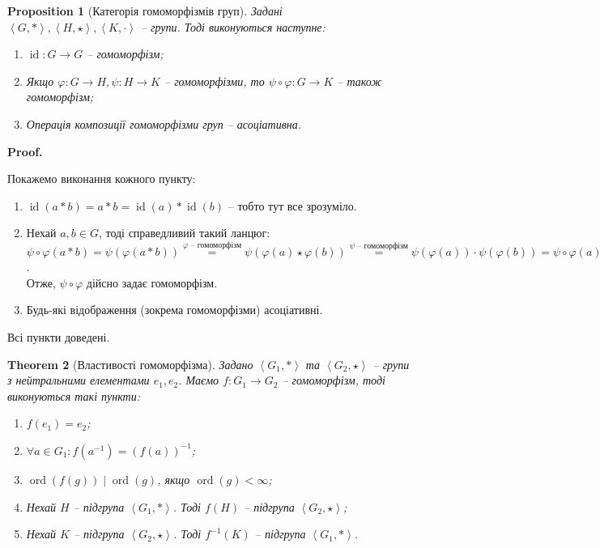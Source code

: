 \documentclass[a4paper, 10pt]{article}
\makeatletter
\theoremstyle{theoremdd}
\newtheorem{theorem}{Theorem}[subsection]
\theoremstyle{theoremdd}
\theoremstyle{theoremdd}
\theoremstyle{theoremdd}
\theoremstyle{theoremdd}
\theoremstyle{theoremdd}
\theoremstyle{theoremdd}
\theoremstyle{theoremdd}
\theoremstyle{theoremdd}
\newtheorem{proposition}[theorem]{Proposition}
\theoremstyle{theoremdd}
\theoremstyle{theoremdd}
\theoremstyle{theoremdd}
\theoremstyle{theoremdd}
\theoremstyle{theoremdd}
\theoremstyle{theoremdd}
\renewenvironment{proof}[1][Proof.\\]{\par
\pushQED{\hfill \qed}%
\normalfont \topsep6\p@\@plus6\p@\relax
\trivlist
\item\relax
{\bfseries
#1\@addpunct{.}}\hspace\labelsep\ignorespaces
}{%
\popQED\endtrivlist\@endpefalse
}
\DeclareMathOperator{\ord}{ord}
\DeclareMathOperator{\id}{id}
\makeatother
\begin{document}
\begin{proposition}[Категорія гомоморфізмів груп]
Задані $\left< G, * \right>, \left< H, \star \right>, \left<K, \cdot \right>$ -- групи. Тоді виконуються наступне:
\begin{enumerate}[nosep,wide=0pt,label={\arabic*)}]
\item $\id \colon G \to G$ -- гомоморфізм;
\item Якщо $\varphi \colon G \! \to H, \psi \colon H \! \to K$ -- гомоморфізми, то $\psi \circ \varphi \colon G \! \to K$ -- також гомоморфізм;
\item Операція композиції гомоморфізми груп -- асоціативна.
\end{enumerate}
\end{proposition}

\begin{proof}
Покажемо виконання кожного пункту:
\begin{enumerate}[wide=0pt,label={\arabic*)}]
\item $\id(a*b) = a*b = \id(a)*\id(b)$ -- тобто тут все зрозуміло.
\item Нехай $a,b \in G$, тоді справедливий такий ланцюг:\\
$\psi \circ \varphi(a*b) = \psi(\varphi(a*b)) \overset{\varphi \text{ -- гомоморфізм}}{=} \psi(\varphi(a) \star \varphi(b)) \overset{\psi \text{ -- гомоморфізм}}{=} \psi(\varphi(a)) \cdot \psi(\varphi(b)) = \psi \circ \varphi(a) \cdot \psi \circ \varphi(b)$.\\
Отже, $\psi \circ \varphi$ дійсно задає гомоморфізм.
\item Будь-які відображення (зокрема гомоморфізми) асоціативні.
\end{enumerate}
Всі пункти доведені.
\end{proof}

\begin{theorem}[Властивості гомоморфізма]
Задано $\left<G_1, * \right>$ та $\left<G_2, \star \right>$ -- групи з нейтральними елементами $e_1,e_2$. Маємо $f \colon G_1 \to G_2$ -- гомоморфізм, тоді виконуються такі пункти:
\begin{enumerate}[nosep,wide=0pt,label={\arabic*)}]
\item $f(e_1) = e_2$;
\item $\forall a \in G_1: f(a^{-1}) = (f(a))^{-1}$;
\item $\ord (f(g)) \mid \ord (g)$, якщо $\ord (g) < \infty$;
\item Нехай $H$ -- підгрупа $\left<G_1,*\right>$. Тоді $f(H)$ -- підгрупа $\left<G_2, \star \right>$;
\item Нехай $K$ -- підгрупа $\left<G_2, \star \right>$. Тоді $f^{-1}(K)$ -- підгрупа $\left<G_1,*\right>$.
\end{enumerate}
\end{theorem}
\end{document}
